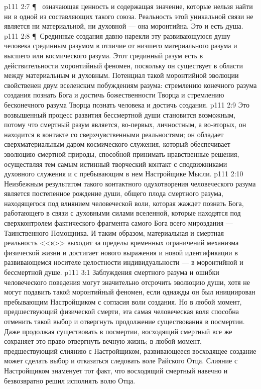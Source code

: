 \vs p111 2:7 \P\ \bibnobreakspace {} означающая ценность и содержащая значение, которые нельзя найти ни в одной из составляющих такого союза. Реальность этой уникальной связи не является ни материальной, ни духовной --- она моронтийна. Это и есть душа.
\vs p111 2:8 \P\ Срединные создания давно нарекли эту развивающуюся душу человека срединным разумом в отличие от низшего материального разума и высшего или космического разума. Этот срединный разум есть в действительности моронтийный феномен, поскольку он существует в области между материальным и духовным. Потенциал такой моронтийной эволюции свойственен двум вселенским побуждениям разума: стремлению конечного разума создания познать Бога и достичь божественности Творца и стремлению бесконечного разума Творца познать человека и достичь  создания.
\vs p111 2:9 Это возвышенный процесс развития бессмертной души становится возможным, потому что смертный разум является, во\hyp{}первых, личностным, а во\hyp{}вторых, он находится в контакте со сверхчувственными реальностями; он обладает сверхматериальным даром космического служения, который обеспечивает эволюцию смертной природы, способной принимать нравственные решения, осуществляя тем самым истинный творческий контакт с сподвижниками духовного служения и с пребывающим в нем Настройщике Мысли.
\vs p111 2:10 Неизбежным результатом такого контактного одухотворения человеческого разума является постепенное рождение души, общего плода смертного разума, находящегося под влиянием человеческой воли, которая жаждет познать Бога, работающего в связи с духовными силами вселенной, которые находятся под сверхконтролем фактического фрагмента самого Бога всего мироздания --- Таинственного Помощника. И таким образом, материальная и смертная реальность <<я>> выходит за пределы временных ограничений механизма физической жизни и достигает нового выражения и новой идентификации в развивающемся носителе целостности индивидуальности --- в моронтийной и бессмертной душе.
\vs p111 3:1 Заблуждения смертного разума и ошибки человеческого поведения могут значительно отсрочить эволюцию души, хотя не могут подавить такой моронтийный феномен, если однажды он был инициирован пребывающим Настройщиком с согласия воли создания. Но в любой момент, предшествующий физической смерти, эта самая человеческая воля способна отменить такой выбор и отвергнуть продолжение существования в посмертии. Даже продолжая существовать в посмертии, восходящий смертный все же сохраняет это право отвергнуть вечную жизнь; в любой момент, предшествующий слиянию с Настройщиком, развивающееся восходящее создание может сделать выбор и отказаться следовать воле Райского Отца. Слияние с Настройщиком знаменует тот факт, что восходящий смертный навечно и безвозвратно решил исполнять волю Отца.
